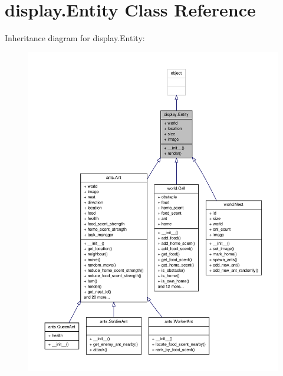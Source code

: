 \hypertarget{classdisplay_1_1Entity}{\section{display.\+Entity Class Reference}
\label{classdisplay_1_1Entity}
}


Inheritance diagram for display.\+Entity\+:
\nopagebreak
\begin{figure}[H]
\begin{center}
\leavevmode
\includegraphics[width=350pt]{classdisplay_1_1Entity__inherit__graph}
\end{center}
\end{figure}


